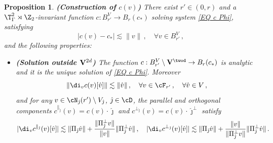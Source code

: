 \documentclass[11pt,a4paper,reqno]{article}
\numberwithin{equation}{section}
\newtheorem{proposition}[theorem]{Proposition}
\theoremstyle{definition}
\begin{document}
        \begin{proposition}\label{Construction of c close and away from PJ} {\bf (Construction of $ c(v) $)}
            There exist $r'\in (0,r)$  and a $\T^2_\Gamma\rtimes \Z_2$-invariant %
            function
            $                c:B_{r'}^V
            \to B_r(c_*) $ 
            solving  system \eqref{EQ c Phi},  satisfying
 \begin{equation}\label{cQ-c*Q d cQ(v)}
                    |c(v)-c_*|\lesssim \| v \| \, ,  \quad \forall   v\in B_{r'}^V \, , 
            \end{equation} 
            and the following properties:
            \begin{itemize}
            \item {\bf (Solution outside ${\bf V}^{2d}$)} The function   
            $ c : B_{r'}^V
             \setminus {\bf V}^{\twod} \to B_r(c_*) $ is analytic and it is the unique solution of \eqref{EQ c Phi}.
             Moreover 
        \begin{equation}\label{|c0-c*| |dc0|}
            \|\di_v c(v)[\hat v]\|\lesssim \|\hat v\|\, , \quad \forall v\in \cF_{r'} \, , \quad \forall 
            \hat v\in V \, , 
        \end{equation}
        and for any $v\in \cN_{\hat \jmath}(r')\setminus V_{\hat \jmath}$, $\hat \jmath \in \cD$, the parallel and orthogonal components $c^{\parallel_{\hat \jmath}}(v) = c(v) \cdot \hat \jmath $ and $c^{\bot_{\hat \jmath}}(v) = c(v) \cdot \hat \jmath^\bot $
        satisfy 
            \begin{equation}\label{derivicino}
                            |\di_v c^{\parallel_{\hat \jmath}}(v) [\hat v]|\lesssim \|\Pi_{\hat \jmath} \hat v\|+\frac{\|\Pi_{\hat \jmath}^\bot v\|}{\| v \|}\|\Pi_{\hat \jmath}^\bot  \hat v \|\, , \quad 
                                |\di_v c^{\bot_{\hat \jmath}}(v)[\hat v]|\lesssim \|\Pi_{\hat \jmath} \hat v\|+\frac{\|v\|}{\| \Pi_{\hat \jmath}^\bot v \|}\|\Pi_{\hat \jmath}^\bot  \hat v \| \, . 
            \end{equation}  

\end{itemize}
\end{proposition}
\end{document}

